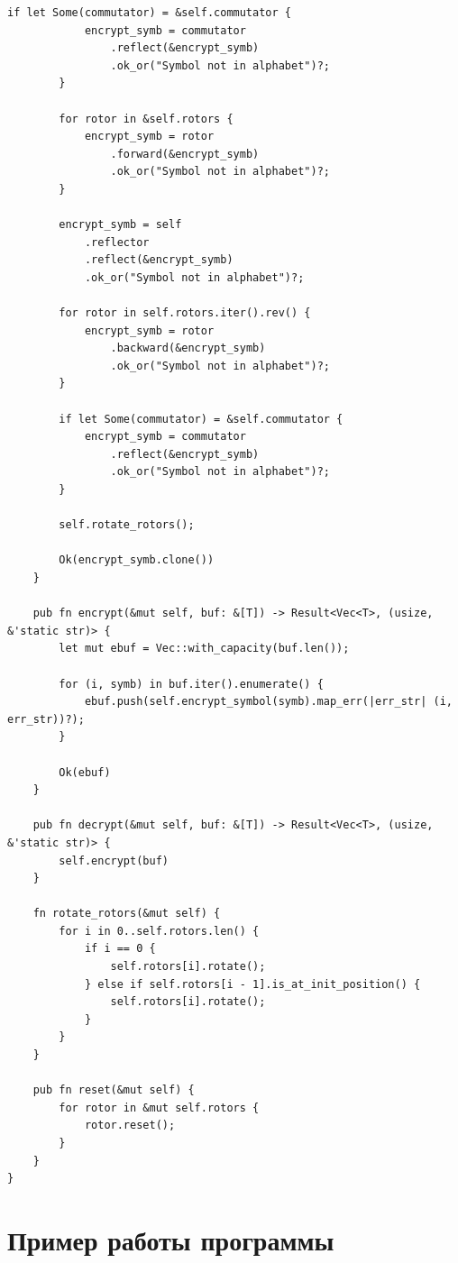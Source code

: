 \begin{center}
\begin{lstlisting}[label=lst:enigma,caption=реализация Энигмы]
        if let Some(commutator) = &self.commutator {
            encrypt_symb = commutator
                .reflect(&encrypt_symb)
                .ok_or("Symbol not in alphabet")?;
        }

        for rotor in &self.rotors {
            encrypt_symb = rotor
                .forward(&encrypt_symb)
                .ok_or("Symbol not in alphabet")?;
        }

        encrypt_symb = self
            .reflector
            .reflect(&encrypt_symb)
            .ok_or("Symbol not in alphabet")?;

        for rotor in self.rotors.iter().rev() {
            encrypt_symb = rotor
                .backward(&encrypt_symb)
                .ok_or("Symbol not in alphabet")?;
        }

        if let Some(commutator) = &self.commutator {
            encrypt_symb = commutator
                .reflect(&encrypt_symb)
                .ok_or("Symbol not in alphabet")?;
        }

        self.rotate_rotors();

        Ok(encrypt_symb.clone())
    }

    pub fn encrypt(&mut self, buf: &[T]) -> Result<Vec<T>, (usize, &'static str)> {
        let mut ebuf = Vec::with_capacity(buf.len());

        for (i, symb) in buf.iter().enumerate() {
            ebuf.push(self.encrypt_symbol(symb).map_err(|err_str| (i, err_str))?);
        }

        Ok(ebuf)
    }

    pub fn decrypt(&mut self, buf: &[T]) -> Result<Vec<T>, (usize, &'static str)> {
        self.encrypt(buf)
    }

    fn rotate_rotors(&mut self) {
        for i in 0..self.rotors.len() {
            if i == 0 {
                self.rotors[i].rotate();
            } else if self.rotors[i - 1].is_at_init_position() {
                self.rotors[i].rotate();
            }
        }
    }

    pub fn reset(&mut self) {
        for rotor in &mut self.rotors {
            rotor.reset();
        }
    }
}
\end{lstlisting}
\end{center}

\clearpage

\section{Пример работы программы}

